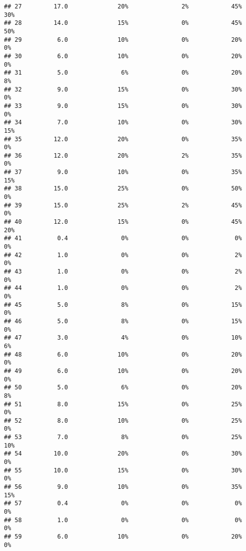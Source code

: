 \documentclass[
]{article}
\begin{document}
\begin{verbatim}
## 27         17.0              20%               2%            45%         30%
## 28         14.0              15%               0%            45%         50%
## 29          6.0              10%               0%            20%          0%
## 30          6.0              10%               0%            20%          0%
## 31          5.0               6%               0%            20%          8%
## 32          9.0              15%               0%            30%          0%
## 33          9.0              15%               0%            30%          0%
## 34          7.0              10%               0%            30%         15%
## 35         12.0              20%               0%            35%          0%
## 36         12.0              20%               2%            35%          0%
## 37          9.0              10%               0%            35%         15%
## 38         15.0              25%               0%            50%          0%
## 39         15.0              25%               2%            45%          0%
## 40         12.0              15%               0%            45%         20%
## 41          0.4               0%               0%             0%          0%
## 42          1.0               0%               0%             2%          0%
## 43          1.0               0%               0%             2%          0%
## 44          1.0               0%               0%             2%          0%
## 45          5.0               8%               0%            15%          0%
## 46          5.0               8%               0%            15%          0%
## 47          3.0               4%               0%            10%          6%
## 48          6.0              10%               0%            20%          0%
## 49          6.0              10%               0%            20%          0%
## 50          5.0               6%               0%            20%          8%
## 51          8.0              15%               0%            25%          0%
## 52          8.0              10%               0%            25%          0%
## 53          7.0               8%               0%            25%         10%
## 54         10.0              20%               0%            30%          0%
## 55         10.0              15%               0%            30%          0%
## 56          9.0              10%               0%            35%         15%
## 57          0.4               0%               0%             0%          0%
## 58          1.0               0%               0%             0%          0%
## 59          6.0              10%               0%            20%          0%

\end{verbatim}
\end{document}
